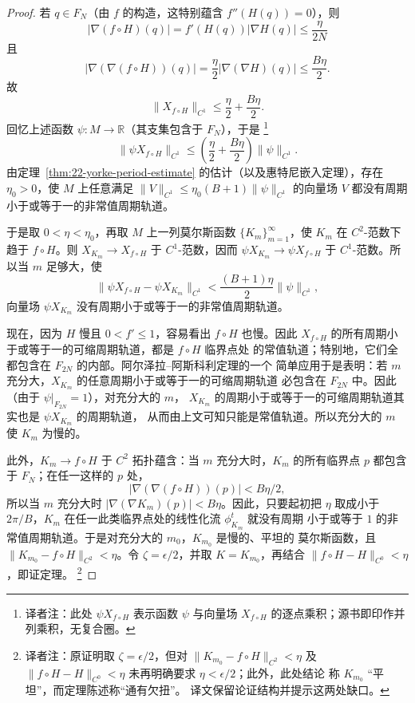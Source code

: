 \begin{proof}
若 $q\in F_N$（由 $f$ 的构造，这特别蕴含 $f''(H(q))=0$），则
\[
 |\nabla(f\circ H)(q)|=f'(H(q))|\nabla H(q)|\leq\frac{\eta}{2N}
\]
且
\[
 |\nabla(\nabla(f\circ H))(q)|
 =\frac{\eta}{2}|\nabla(\nabla H)(q)|\leq\frac{B\eta}{2}.
\]
故
\[
 \lVert X_{f\circ H}\rVert_{C^1}
 \leq\frac{\eta}{2}+\frac{B\eta}{2}.
\]
回忆上述函数 $\psi:M\to\mathbb R$（其支集包含于 $F_N$），于是
\footnote{译者注：此处 $\psi X_{f\circ H}$ 表示函数 $\psi$ 与向量场
$X_{f\circ H}$ 的逐点乘积；源书即印作并列乘积，无复合圈。}
\[
 \lVert\psi X_{f\circ H}\rVert_{C^1}
 \leq\left(\frac{\eta}{2}+\frac{B\eta}{2}\right)
 \lVert\psi\rVert_{C^1}.
\]
由定理~\ref{thm:22-yorke-period-estimate} 的估计（以及惠特尼嵌入定理），存在
$\eta_0>0$，使 $M$ 上任意满足
$\lVert V\rVert_{C^1}\leq\eta_0(B+1)\lVert\psi\rVert_{C^1}$ 的向量场 $V$
都没有周期小于或等于一的非常值周期轨道。

于是取 $0<\eta<\eta_0$，再取 $M$ 上一列莫尔斯函数
$\{K_m\}_{m=1}^\infty$，使 $K_m$ 在 $C^2$-范数下趋于 $f\circ H$。则
$X_{K_m}\to X_{f\circ H}$ 于 $C^1$-范数，因而
$\psi X_{K_m}\to\psi X_{f\circ H}$ 于 $C^1$-范数。所以当 $m$ 足够大，使
\[
 \lVert\psi X_{f\circ H}-\psi X_{K_m}\rVert_{C^1}
 <\frac{(B+1)\eta}{2}\lVert\psi\rVert_{C^1},
\]
向量场 $\psi X_{K_m}$ 没有周期小于或等于一的非常值周期轨道。

现在，因为 $H$ 慢且 $0<f'\leq1$，容易看出 $f\circ H$ 也慢。因此
$X_{f\circ H}$ 的所有周期小于或等于一的可缩周期轨道，都是 $f\circ H$ 临界点处
的常值轨道；特别地，它们全都包含在 $F_{2N}$ 的内部。阿尔泽拉--阿斯科利定理的一个
简单应用于是表明：若 $m$ 充分大，$X_{K_m}$ 的任意周期小于或等于一的可缩周期轨道
必包含在 $F_{2N}$ 中。因此（由于 $\psi|_{F_{2N}}=1$），对充分大的 $m$，
$X_{K_m}$ 的周期小于或等于一的可缩周期轨道其实也是 $\psi X_{K_m}$ 的周期轨道，
从而由上文可知只能是常值轨道。所以充分大的 $m$ 使 $K_m$ 为慢的。

此外，$K_m\to f\circ H$ 于 $C^2$ 拓扑蕴含：当 $m$ 充分大时，$K_m$ 的所有临界点
$p$ 都包含于 $F_N$；在任一这样的 $p$ 处，
\[
 |\nabla(\nabla(f\circ H))(p)|<B\eta/2,
\]
所以当 $m$ 充分大时 $|\nabla(\nabla K_m)(p)|<B\eta$。因此，只要起初把 $\eta$
取成小于 $2\pi/B$，$K_m$ 在任一此类临界点处的线性化流 $\phi_{K_m}^t$ 就没有周期
小于或等于 $1$ 的非常值周期轨道。于是对充分大的 $m_0$，$K_{m_0}$ 是慢的、平坦的
莫尔斯函数，且
$\lVert K_{m_0}-f\circ H\rVert_{C^2}<\eta$。令 $\zeta=\epsilon/2$，并取
$K=K_{m_0}$，再结合 $\lVert f\circ H-H\rVert_{C^0}<\eta$，即证定理。
\footnote{译者注：原证明取 $\zeta=\epsilon/2$，但对
$\lVert K_{m_0}-f\circ H\rVert_{C^2}<\eta$ 及
$\lVert f\circ H-H\rVert_{C^0}<\eta$ 未再明确要求 $\eta<\epsilon/2$；此外，此处结论
称 $K_{m_0}$ “平坦”，而定理陈述称“通有欠扭”。
译文保留论证结构并提示这两处缺口。}
\end{proof}
